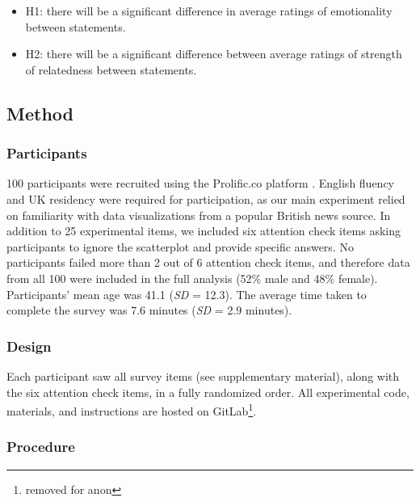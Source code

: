 \documentclass[manuscript,screen,review,anonymous]{acmart}
\providecommand{\tightlist}{%
  \setlength{\itemsep}{0pt}\setlength{\parskip}{0pt}}\usepackage{longtable,booktabs,array}
\begin{document}
\begin{itemize}
\tightlist
\item
  H1: there will be a significant difference in average ratings of
  emotionality between statements.
\item
  H2: there will be a significant difference between average ratings of
  strength of relatedness between statements.
\end{itemize}

\subsection{Method}\label{sec-method-pre}

\subsubsection{Participants}\label{sec-participants-pre}

100 participants were recruited using the Prolific.co platform
\citep{prolific}. English fluency and UK residency were required for
participation, as our main experiment relied on familiarity with data
visualizations from a popular British news source. In addition to 25
experimental items, we included six attention check items asking
participants to ignore the scatterplot and provide specific answers. No
participants failed more than 2 out of 6 attention check items, and
therefore data from all 100 were included in the full analysis (52\%
male and 48\% female). Participants' mean age was 41.1 (\emph{SD} =
12.3). The average time taken to complete the survey was 7.6 minutes
(\emph{SD} = 2.9 minutes).

\subsubsection{Design}\label{sec-design-pre}

Each participant saw all survey items (see supplementary material),
along with the six attention check items, in a fully randomized order.
All experimental code, materials, and instructions are hosted on
GitLab\footnote{removed for anon}.

\subsubsection{Procedure}\label{sec-procedure-pre}
\end{document}
